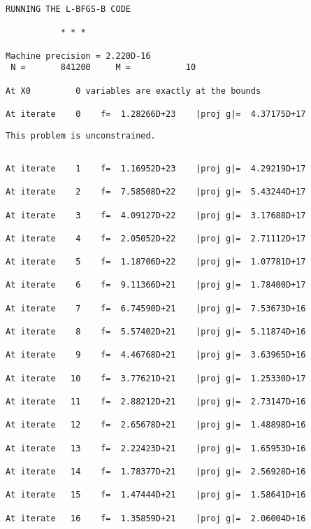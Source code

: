 \documentclass[11pt]{article}
\begin{document}
    \begin{Verbatim}[commandchars=\\\{\}]
RUNNING THE L-BFGS-B CODE

           * * *

Machine precision = 2.220D-16
 N =       841200     M =           10

At X0         0 variables are exactly at the bounds

At iterate    0    f=  1.28266D+23    |proj g|=  4.37175D+17
    \end{Verbatim}

    \begin{Verbatim}[commandchars=\\\{\}]
 This problem is unconstrained.
    \end{Verbatim}

    \begin{Verbatim}[commandchars=\\\{\}]

At iterate    1    f=  1.16952D+23    |proj g|=  4.29219D+17

At iterate    2    f=  7.58508D+22    |proj g|=  5.43244D+17

At iterate    3    f=  4.09127D+22    |proj g|=  3.17688D+17

At iterate    4    f=  2.05052D+22    |proj g|=  2.71112D+17

At iterate    5    f=  1.18706D+22    |proj g|=  1.07781D+17

At iterate    6    f=  9.11366D+21    |proj g|=  1.78400D+17

At iterate    7    f=  6.74590D+21    |proj g|=  7.53673D+16

At iterate    8    f=  5.57402D+21    |proj g|=  5.11874D+16

At iterate    9    f=  4.46768D+21    |proj g|=  3.63965D+16

At iterate   10    f=  3.77621D+21    |proj g|=  1.25330D+17

At iterate   11    f=  2.88212D+21    |proj g|=  2.73147D+16

At iterate   12    f=  2.65678D+21    |proj g|=  1.48898D+16

At iterate   13    f=  2.22423D+21    |proj g|=  1.65953D+16

At iterate   14    f=  1.78377D+21    |proj g|=  2.56928D+16

At iterate   15    f=  1.47444D+21    |proj g|=  1.58641D+16

At iterate   16    f=  1.35859D+21    |proj g|=  2.06004D+16


\end{Verbatim}
\end{document}
